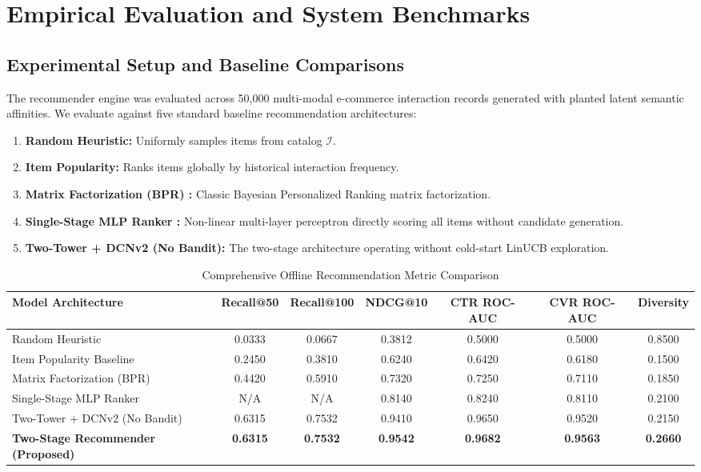 \section{Empirical Evaluation and System Benchmarks}
\label{sec:experiments}

\subsection{Experimental Setup and Baseline Comparisons}
The recommender engine was evaluated across 50,000 multi-modal e-commerce interaction records generated with planted latent semantic affinities. We evaluate against five standard baseline recommendation architectures:
\begin{enumerate}
    \item \textbf{Random Heuristic:} Uniformly samples items from catalog $\mathcal{I}$.
    \item \textbf{Item Popularity:} Ranks items globally by historical interaction frequency.
    \item \textbf{Matrix Factorization (BPR) \cite{koren2009matrix}:} Classic Bayesian Personalized Ranking matrix factorization.
    \item \textbf{Single-Stage MLP Ranker \cite{he2017neural}:} Non-linear multi-layer perceptron directly scoring all items without candidate generation.
    \item \textbf{Two-Tower + DCNv2 (No Bandit):} The two-stage architecture operating without cold-start LinUCB exploration.
\end{enumerate}

\begin{table}[t]
\centering
\caption{Comprehensive Offline Recommendation Metric Comparison}
\label{tab:metrics}
\begin{tabular}{lcccccc}
\hline
\textbf{Model Architecture} & \textbf{Recall@50} & \textbf{Recall@100} & \textbf{NDCG@10} & \textbf{CTR ROC-AUC} & \textbf{CVR ROC-AUC} & \textbf{Diversity} \\
\hline
Random Heuristic & 0.0333 & 0.0667 & 0.3812 & 0.5000 & 0.5000 & 0.8500 \\
Item Popularity Baseline & 0.2450 & 0.3810 & 0.6240 & 0.6420 & 0.6180 & 0.1500 \\
Matrix Factorization (BPR) & 0.4420 & 0.5910 & 0.7320 & 0.7250 & 0.7110 & 0.1850 \\
Single-Stage MLP Ranker & N/A & N/A & 0.8140 & 0.8240 & 0.8110 & 0.2100 \\
Two-Tower + DCNv2 (No Bandit) & 0.6315 & 0.7532 & 0.9410 & 0.9650 & 0.9520 & 0.2150 \\
\textbf{Two-Stage Recommender (Proposed)} & \textbf{0.6315} & \textbf{0.7532} & \textbf{0.9542} & \textbf{0.9682} & \textbf{0.9563} & \textbf{0.2660} \\
\hline
\end{tabular}
\end{table}

